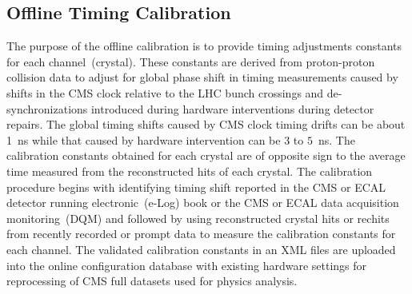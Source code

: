 \subsection{Offline Timing Calibration}
The purpose of the offline calibration is to provide timing adjustments constants for each channel~(crystal). %
 These constants are derived from  proton-proton collision data to adjust for global phase shift in timing measurements caused by shifts in the CMS clock relative to the LHC bunch crossings and de-synchronizations introduced during hardware interventions during detector repairs. The global timing shifts caused by CMS clock timing drifts can be about 1~ns while that caused by hardware intervention can be $3$ to $5$~ns. The calibration constants obtained for each crystal are of opposite sign to the average time measured from the reconstructed hits of each crystal.
The calibration procedure begins with identifying  timing shift reported in the CMS or ECAL detector running electronic~(e-Log) book or the CMS or ECAL data acquisition monitoring~(DQM) and followed by using  reconstructed crystal hits or rechits from recently recorded or prompt data to measure the calibration constants for each channel. The validated calibration constants in an XML files are uploaded into the online configuration database with existing hardware settings for reprocessing of CMS full datasets used for physics analysis.
